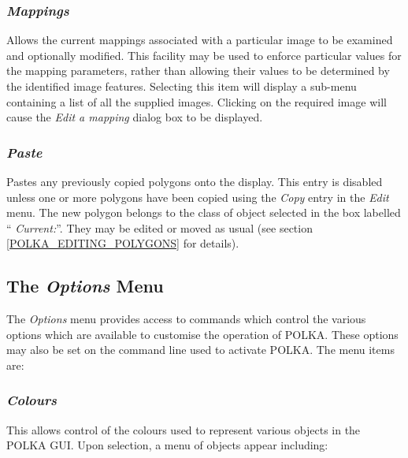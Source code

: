 \documentclass[11pt]{article}
\newcommand{\hyperref}[4]{#2\ref{#4}#3}
\newcommand{\htmlref}[2]{#1}
\newcommand{\xlabel}[1]{}
\newcommand{\mylabel}[1] {\xlabel{#1}\label{#1}}
\begin{document}
\subsubsection {\mylabel{POLKA_EDIT_MAPPINGS}\emph{Mappings}} Allows the current
mappings associated with a particular image to be examined and optionally
modified. This facility may be used to enforce particular values for the
mapping parameters, rather than allowing their values to be determined by
the identified image features. Selecting this item will display a
sub-menu containing a list of all the supplied images. Clicking on the
required image will cause the \htmlref{\emph{Edit a
mapping}}{POLKA_EDIT_MAPPING_DIALOG} dialog box to be displayed.

\subsubsection {\mylabel{POLKA_PASTE}\emph{Paste}} Pastes any previously
copied polygons onto the display. This entry is disabled unless one or
more polygons have been copied using the \htmlref{\emph{Copy}}{POLKA_COPY}
entry in the \emph{Edit} menu. The new polygon belongs to the class of
object selected in the box labelled ``\htmlref{{\em
Current:}}{POLKA_CURRENT}''. They may be edited or moved as usual
(\hyperref{go here}{see section }{}{POLKA_EDITING_POLYGONS} for details).

\subsection {\mylabel{POLKA_OPTIONS_MENU}The \emph{Options} Menu}
The \emph{Options} menu provides access to commands which control the
various options which are available to customise the operation of POLKA.
These options may also be set on the command line used to activate
POLKA. The menu items are:

\subsubsection {\mylabel{POLKA_COLOURS}\emph{Colours}}
This allows control of the colours used to represent various objects in
the POLKA GUI. Upon selection, a menu of objects appear including:
\end{document}
